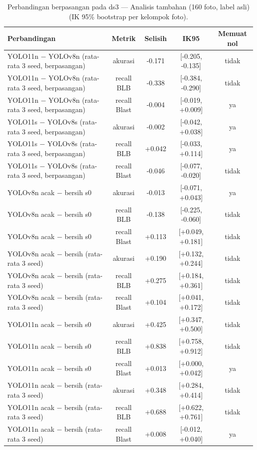\begin{table}[!t]
\centering
\caption{Perbandingan berpasangan pada ds3 — Analisis tambahan (160 foto, label asli) (IK 95\% bootstrap per kelompok foto).}
\label{tab:ds3_tambahan_banding}
\footnotesize
\begin{tabular}{lcccc}
\hline
\textbf{Perbandingan} & \textbf{Metrik} & \textbf{Selisih} & \textbf{IK95} & \textbf{Memuat nol} \\
\hline
YOLO11n − YOLOv8n (rata-rata 3 seed, berpasangan) & akurasi & -0.171 & [-0.205, -0.135] & tidak \\
YOLO11n − YOLOv8n (rata-rata 3 seed, berpasangan) & recall BLB & -0.338 & [-0.384, -0.290] & tidak \\
YOLO11n − YOLOv8n (rata-rata 3 seed, berpasangan) & recall Blast & -0.004 & [-0.019, +0.009] & ya \\
YOLO11s − YOLOv8s (rata-rata 3 seed, berpasangan) & akurasi & -0.002 & [-0.042, +0.038] & ya \\
YOLO11s − YOLOv8s (rata-rata 3 seed, berpasangan) & recall BLB & +0.042 & [-0.033, +0.114] & ya \\
YOLO11s − YOLOv8s (rata-rata 3 seed, berpasangan) & recall Blast & -0.046 & [-0.077, -0.020] & tidak \\
YOLOv8n acak − bersih s0 & akurasi & -0.013 & [-0.071, +0.043] & ya \\
YOLOv8n acak − bersih s0 & recall BLB & -0.138 & [-0.225, -0.060] & tidak \\
YOLOv8n acak − bersih s0 & recall Blast & +0.113 & [+0.049, +0.181] & tidak \\
YOLOv8n acak − bersih (rata-rata 3 seed) & akurasi & +0.190 & [+0.132, +0.244] & tidak \\
YOLOv8n acak − bersih (rata-rata 3 seed) & recall BLB & +0.275 & [+0.184, +0.361] & tidak \\
YOLOv8n acak − bersih (rata-rata 3 seed) & recall Blast & +0.104 & [+0.041, +0.172] & tidak \\
YOLO11n acak − bersih s0 & akurasi & +0.425 & [+0.347, +0.500] & tidak \\
YOLO11n acak − bersih s0 & recall BLB & +0.838 & [+0.758, +0.912] & tidak \\
YOLO11n acak − bersih s0 & recall Blast & +0.013 & [+0.000, +0.042] & ya \\
YOLO11n acak − bersih (rata-rata 3 seed) & akurasi & +0.348 & [+0.284, +0.414] & tidak \\
YOLO11n acak − bersih (rata-rata 3 seed) & recall BLB & +0.688 & [+0.622, +0.761] & tidak \\
YOLO11n acak − bersih (rata-rata 3 seed) & recall Blast & +0.008 & [-0.012, +0.040] & ya \\
\hline
\end{tabular}
\end{table}
